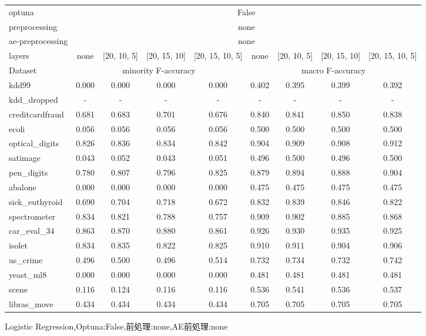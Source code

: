 \begin{figure}[ht]
    \caption{Logistic Regression,Optuna:False,前処理:none,AE前処理:none}
    \label{fig:lr&optuna-False&preprocessing-none&ae-preprocessing-none}
    \begin{tabular}{l*{8}{c}}
        
        optuna&\multicolumn{8}{c}{False}\\
        preprocessing&\multicolumn{8}{c}{none}\\
        ae-preprocessing&\multicolumn{8}{c}{none}\\
        layers&none&[20, 10, 5]&[20, 15, 10]&[20, 15, 10, 5]&none&[20, 10, 5]&[20, 15, 10]&[20, 15, 10, 5]\\
        \hline
        Dataset&\multicolumn{4}{c}{minority F-accuracy}&\multicolumn{4}{c}{macro F-accuracy}\\
        \hline
        kdd99&0.000&0.000&0.000&0.000&0.402&0.395&0.399&0.392\\
        kdd\_dropped&-&-&-&-&-&-&-&-\\
        creditcardfraud&0.681&0.683&0.701&0.676&0.840&0.841&0.850&0.838\\
        ecoli&0.056&0.056&0.056&0.056&0.500&0.500&0.500&0.500\\
        optical\_digits&0.826&0.836&0.834&0.842&0.904&0.909&0.908&0.912\\
        satimage&0.043&0.052&0.043&0.051&0.496&0.500&0.496&0.500\\
        pen\_digits&0.780&0.807&0.796&0.825&0.879&0.894&0.888&0.904\\
        abalone&0.000&0.000&0.000&0.000&0.475&0.475&0.475&0.475\\
        sick\_euthyroid&0.690&0.704&0.718&0.672&0.832&0.839&0.846&0.822\\
        spectrometer&0.834&0.821&0.788&0.757&0.909&0.902&0.885&0.868\\
        car\_eval\_34&0.863&0.870&0.880&0.861&0.926&0.930&0.935&0.925\\
        isolet&0.834&0.835&0.822&0.825&0.910&0.911&0.904&0.906\\
        us\_crime&0.496&0.500&0.496&0.514&0.732&0.734&0.732&0.742\\
        yeast\_ml8&0.000&0.000&0.000&0.000&0.481&0.481&0.481&0.481\\
        scene&0.116&0.124&0.116&0.116&0.536&0.541&0.536&0.537\\
        libras\_move&0.434&0.434&0.434&0.434&0.705&0.705&0.705&0.705\\

\end{tabular}
\end{figure}
